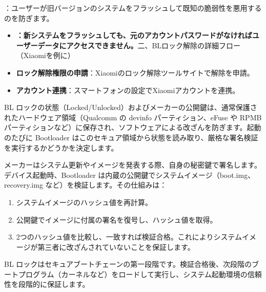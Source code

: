 


：ユーザーが旧バージョンのシステムをフラッシュして既知の脆弱性を悪用するのを防ぎます。


\begin{itemize}
  \item \textbf{：新システムをフラッシュしても、元のアカウントパスワードがなければユーザーデータにアクセスできません。}二、BLロック解除の詳細フロー（Xiaomiを例に）
  \item \textbf{ロック解除権限の申請}：Xiaomiのロック解除ツールサイトで解除を申請。
  \item \textbf{アカウント連携}：スマートフォンの設定でXiaomiアカウントを連携。
\end{itemize}


BL ロックの状態（Locked/Unlocked）およびメーカーの公開鍵は、通常保護されたハードウェア領域（Qualcomm の devinfo パーティション、eFuse や RPMB パーティションなど）に保存され、ソフトウェアによる改ざんを防ぎます。起動のたびに Bootloader はこのセキュア領域から状態を読み取り、厳格な署名検証を実行するかどうかを決定します。


メーカーはシステム更新やイメージを発表する際、自身の秘密鍵で署名します。デバイス起動時、Bootloader は内蔵の公開鍵でシステムイメージ（boot.img、recovery.img など）を検証します。その仕組みは：

\begin{enumerate}
  \item システムイメージのハッシュ値を再計算。
  \item 公開鍵でイメージに付属の署名を復号し、ハッシュ値を取得。
  \item 2つのハッシュ値を比較し、一致すれば検証合格。これによりシステムイメージが第三者に改ざんされていないことを保証します。
\end{enumerate}


BL ロックはセキュアブートチェーンの第一段階です。検証合格後、次段階のブートプログラム（カーネルなど）をロードして実行し、システム起動環境の信頼性を段階的に保証します。

